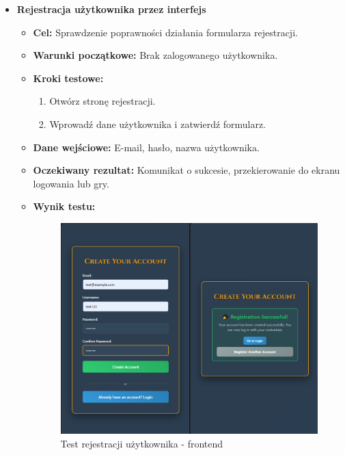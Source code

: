 \begin{itemize}
    \item \textbf{Rejestracja użytkownika przez interfejs}
    \begin{itemize}
        \item \textbf{Cel:} Sprawdzenie poprawności działania formularza rejestracji.
        \item \textbf{Warunki początkowe:} Brak zalogowanego użytkownika.
        \item \textbf{Kroki testowe:}
        \begin{enumerate}
            \item Otwórz stronę rejestracji.
            \item Wprowadź dane użytkownika i zatwierdź formularz.
        \end{enumerate}
        \item \textbf{Dane wejściowe:} E-mail, hasło, nazwa użytkownika.
        \item \textbf{Oczekiwany rezultat:} Komunikat o sukcesie, przekierowanie do ekranu logowania lub gry.
        \item \textbf{Wynik testu:}
        \begin{figure}[H]
            \includegraphics[width=480px]{figures/testy/test-registration-front.png}
            \caption{Test rejestracji użytkownika - frontend}
        \end{figure}
    \end{itemize}



\end{itemize}
